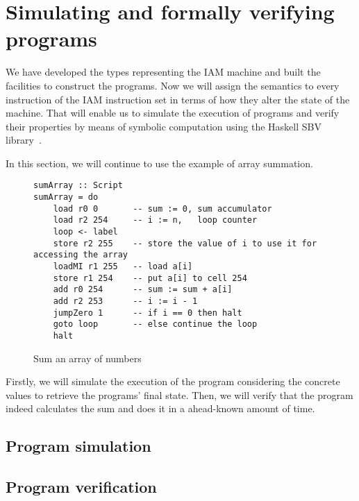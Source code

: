 \section{Simulating and formally verifying programs}

We have developed the types representing the IAM machine and built the facilities
to construct the programs. Now we will assign the semantics to every instruction
of the IAM instruction set in terms of how they alter the state of the machine.
That will enable us to simulate the execution of programs and verify their properties
by means of symbolic computation using the Haskell SBV library~\cite{SBV}.

In this section, we will continue to use the example of array summation.

\begin{figure}[H]
\begin{verbatim}
sumArray :: Script
sumArray = do
    load r0 0       -- sum := 0, sum accumulator
    load r2 254     -- i := n,   loop counter
    loop <- label
    store r2 255    -- store the value of i to use it for accessing the array
    loadMI r1 255   -- load a[i]
    store r1 254    -- put a[i] to cell 254
    add r0 254      -- sum := sum + a[i]
    add r2 253      -- i := i - 1
    jumpZero 1      -- if i == 0 then halt
    goto loop       -- else continue the loop
    halt
\end{verbatim}
\caption{Sum an array of numbers}
\label{arraySum}
\end{figure}

Firstly, we will simulate the execution of the program considering the concrete
values to retrieve the programs' final state. Then, we will verify that the program
indeed calculates the sum and does it in a ahead-known amount of time.

\subsection{Program simulation}



\subsection{Program verification}